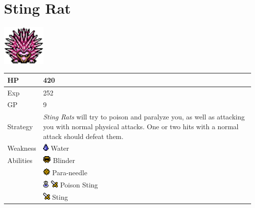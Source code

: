 \section{Sting Rat}
\label{monster:sting_rat}

\includegraphics[height=2cm,keepaspectratio]{./resources/monster/sting_rat}

\begin{longtable}{ l p{9cm} }
	HP
	& 420
\\ \hline
	Exp
	& 252
\\ \hline
	GP
	& 9
\\ \hline
	Strategy
	& \textit{Sting Rats} will try to poison and paralyze you, as well as attacking you with normal physical attacks. One or two hits with a normal attack should defeat them.
\\ \hline
	Weakness
	& \includegraphics[height=1em,keepaspectratio]{./resources/effects/water} Water
\\ \hline
	Abilities
	& \includegraphics[height=1em,keepaspectratio]{./resources/effects/blind} Blinder \\
	& \includegraphics[height=1em,keepaspectratio]{./resources/effects/paralyze} Para-needle \\
	& \includegraphics[height=1em,keepaspectratio]{./resources/effects/poison} \includegraphics[height=1em,keepaspectratio]{./resources/effects/damage} Poison Sting \\
	& \includegraphics[height=1em,keepaspectratio]{./resources/effects/damage} Sting
\end{longtable}
